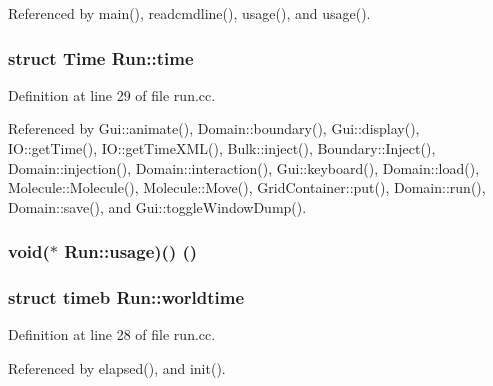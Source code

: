 Referenced by main(), readcmdline(), usage(), and usage().\hypertarget{namespaceRun_0b48df515ddd51b80cedcfd90d8c1dc3}{
\subsubsection[{time}]{\setlength{\rightskip}{0pt plus 5cm}struct {\bf Time} {\bf Run::time}}}
\label{namespaceRun_0b48df515ddd51b80cedcfd90d8c1dc3}




Definition at line 29 of file run.cc.

Referenced by Gui::animate(), Domain::boundary(), Gui::display(), IO::getTime(), IO::getTimeXML(), Bulk::inject(), Boundary::Inject(), Domain::injection(), Domain::interaction(), Gui::keyboard(), Domain::load(), Molecule::Molecule(), Molecule::Move(), GridContainer::put(), Domain::run(), Domain::save(), and Gui::toggleWindowDump().\hypertarget{namespaceRun_110719db892c2b065597a3ded0d90c2d}{
\subsubsection[{usage}]{\setlength{\rightskip}{0pt plus 5cm}void($\ast$ {\bf Run::usage})() ()}}
\label{namespaceRun_110719db892c2b065597a3ded0d90c2d}


\hypertarget{namespaceRun_73327ac5b154c258e9b88ea0260d50ad}{
\subsubsection[{worldtime}]{\setlength{\rightskip}{0pt plus 5cm}struct timeb {\bf Run::worldtime}}}
\label{namespaceRun_73327ac5b154c258e9b88ea0260d50ad}




Definition at line 28 of file run.cc.

Referenced by elapsed(), and init().